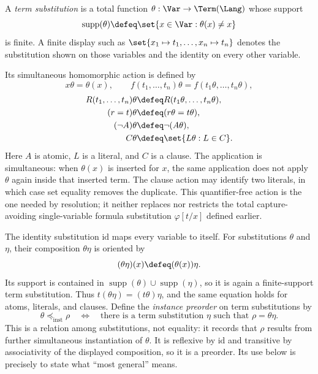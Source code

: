 \begin{definition}
A \emph{term substitution} is a total function
\(\theta:\Var\to\Term(\Lang)\) whose support
\[
 \operatorname{supp}(\theta)
 \defeq\set{x\in\Var:\theta(x)\ne x}
\]
is finite.  A finite display such as
\(\set{x_1\mapsto t_1,\ldots,x_n\mapsto t_n}\) denotes the substitution
shown on those variables and the identity on every other variable.

Its simultaneous homomorphic action is defined by
\[
 x\theta=\theta(x),
 \qquad
 f(t_1,\ldots,t_n)\theta
 =f(t_1\theta,\ldots,t_n\theta),
\]
\[
 \begin{aligned}
 R(t_1,\ldots,t_n)\theta
   &\defeq R(t_1\theta,\ldots,t_n\theta),\\
 (r=t)\theta&\defeq(r\theta=t\theta),\\
 (\neg A)\theta&\defeq\neg(A\theta),\\
 C\theta&\defeq\set{L\theta:L\in C}.
 \end{aligned}
\]
Here \(A\) is atomic, \(L\) is a literal, and \(C\) is a clause.  The
application is simultaneous: when \(\theta(x)\) is inserted for \(x\), the
same application does not apply \(\theta\) again inside that inserted term.
The clause action may identify two literals, in which case set equality
removes the duplicate.  This quantifier-free action is the one needed by
resolution; it neither replaces nor restricts the total capture-avoiding
single-variable formula substitution \(\varphi[t/x]\) defined earlier.
\end{definition}

\begin{definition}
The identity substitution \(\mathrm{id}\) maps every variable to itself.  For
substitutions \(\theta\) and \(\eta\), their composition \(\theta\eta\) is
oriented by
\[
 (\theta\eta)(x)\defeq(\theta(x))\eta.
\]
Its support is contained in
\(\operatorname{supp}(\theta)\cup\operatorname{supp}(\eta)\), so it is
again a finite-support term substitution.
Thus \(t(\theta\eta)=(t\theta)\eta\), and the same equation holds for
atoms, literals, and clauses.  Define the \emph{instance preorder} on term
substitutions by
\[
 \theta\preceq_{\mathrm{inst}}\rho
 \quad\Longleftrightarrow\quad
 \text{there is a term substitution \(\eta\) such that }
 \rho=\theta\eta.
\]
This is a relation among substitutions, not equality: it records that
\(\rho\) results from further simultaneous instantiation of \(\theta\).
It is reflexive by \(\mathrm{id}\) and transitive by associativity of the
displayed composition, so it is a preorder.  Its use below is precisely to
state what ``most general'' means.
\end{definition}

